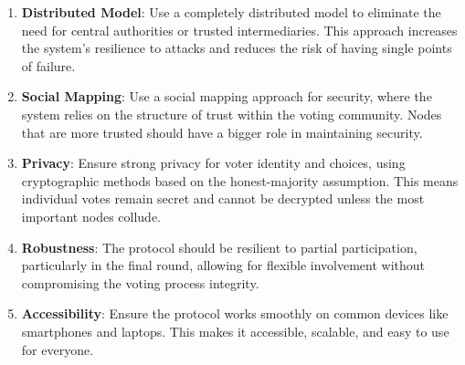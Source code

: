 \documentclass[runningheads]{llncs}
\begin{document}
\begin{enumerate}
    \item \textbf{Distributed Model}: Use a completely distributed model to eliminate the need for central authorities or trusted intermediaries. This approach increases the system's resilience to attacks and reduces the risk of having single points of failure.
    \item \textbf{Social Mapping}: Use a social mapping approach for security, where the system relies on the structure of trust within the voting community. Nodes that are more trusted should have a bigger role in maintaining security.
    \item \textbf{Privacy}: Ensure strong privacy for voter identity and choices, using cryptographic methods based on the honest-majority assumption. This means individual votes remain secret and cannot be decrypted unless the most important nodes collude.
    \item \textbf{Robustness}: The protocol should be resilient to partial participation, particularly in the final round, allowing for flexible involvement without compromising the voting process integrity.
    \item \textbf{Accessibility}: Ensure the protocol works smoothly on common devices like smartphones and laptops. This makes it accessible, scalable, and easy to use for everyone.
\end{enumerate}


\newcommand{\PartySecretKey}[1]{\ensuremath{s_{#1}}}
\newcommand{\Party}[1]{\ensuremath{P_{#1}}}

\newcommand{\EncryptionKey}{\textbf{E}}
\newcommand{\DecryptionKey}{\textbf{d}}

\newcommand{\PartialDecryptionKey}[1]{\ensuremath{d_{#1}}}
\newcommand{\PartialEncryptionKey}[1]{\ensuremath{E_{#1}}}

\newcommand{\EncryptedPartialDecryptionKeyShare}[2]{\ensuremath{C_{#1,#2}}}
\newcommand{\SetOfEncryptedPartialDecryptionKeys}{\ensuremath{\mathbb{C}}}
\newcommand{\SetOfFDKG}{\ensuremath{\mathbb{D}}}
\newcommand{\SetOfSharesOfPartialDecryption}{\ensuremath{\mathbb{C}}}

\newcommand{\IthDecryptionKey}[1]{\ensuremath{d_{#1}}}
\newcommand{\IthEncryptionKey}[1]{E_{#1}}

\newcommand{\DecryptionUsingOf}[2]{\ensuremath{\texttt{Dec}_{#1}(#2)}}
\newcommand{\EncryptionUsingOf}[2]{\ensuremath{\texttt{Enc}_{#1}(#2)}}
\end{document}
